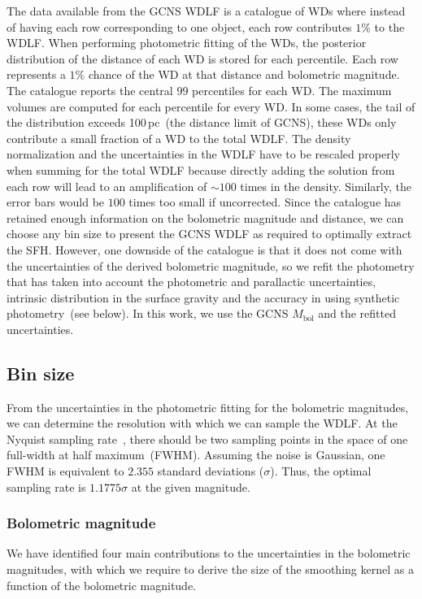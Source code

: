 \documentclass[fleqn,usenatbib]{mnras}
\begin{document}
The data available from the GCNS WDLF is a catalogue of WDs where instead of
having each row corresponding to one object, each row contributes $1\%$ to the
WDLF. When performing photometric fitting of the WDs, the posterior distribution
of the distance of each WD is stored for each percentile. Each row represents
a $1\%$ chance of the WD at that distance and bolometric magnitude. The catalogue
reports the central $99$ percentiles for each WD. The maximum volumes are computed
for each percentile for every WD. In some cases, the tail of the distribution
exceeds 100\,pc~(the distance limit of GCNS), these WDs only contribute a small
fraction of a WD to the total WDLF. The density normalization and the
uncertainties in the WDLF have to be rescaled properly when summing for the
total WDLF because directly adding the solution from each row will lead to an
amplification of $\sim$$100$ times in the density. Similarly, the error bars
would be $100$ times too small if uncorrected. Since the catalogue has retained
enough information on the bolometric magnitude and distance, we can choose any
bin size to present the GCNS WDLF as required to optimally extract
the SFH. However, one downside of the catalogue is that it does not come with
the uncertainties of the derived bolometric magnitude, so we refit the photometry
that has taken into account the photometric and parallactic uncertainties,
intrinsic distribution in the surface gravity and the accuracy in using
synthetic photometry~(see below). In this work, we use the GCNS $M_\mathrm{bol}$
and the refitted uncertainties.

\subsection{Bin size}
\label{sec:magnitude_bin_size}
From the uncertainties in the photometric fitting for the bolometric magnitudes,
we can determine the resolution with which we can sample the WDLF. At the Nyquist
sampling rate~\citep{1949IEEEP..37...10S}, there should be two sampling points
in the space of one full-width at half maximum~(FWHM). Assuming the noise is
Gaussian, one FWHM is equivalent to $2.355$ standard deviations ($\sigma$).
Thus, the optimal sampling rate is $1.1775\sigma$ at the given magnitude.

\subsubsection{Bolometric magnitude}
We have identified four main contributions to the uncertainties in the
bolometric magnitudes, with which we require to derive the size of the
smoothing kernel as a function of the bolometric magnitude.
\end{document}
